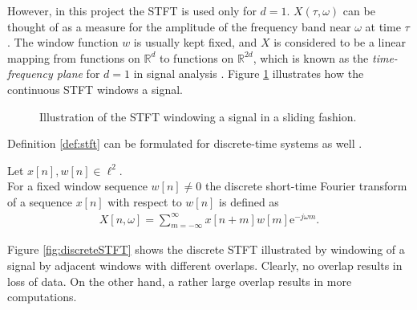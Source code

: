 However, in this project the STFT is used only for $d = 1$. $X(\tau,\omega)$ can be thought of as a measure for the amplitude of the frequency band near $\omega$ at time $\tau$. The window function $w$ is usually kept fixed, and $X$ is considered to be a linear mapping from functions on $\mathbb{R}^d$ to functions on $\mathbb{R}^{2d}$, which is known as the \textit{time-frequency plane} for $d=1$ in signal analysis \cite{page 38, FTFA}. Figure \ref{fig:sliding_stft} illustrates how the continuous STFT windows a signal.
\begin{figure}[H]
\centering
{}
\caption{Illustration of the STFT windowing a signal in a sliding fashion.}
\label{fig:sliding_stft}
\end{figure}
Definition \ref{def:stft} can be formulated for discrete-time systems as well \cite{page 846, DTSP}.
\begin{definition}\label{def:stft_discrete}
Let $x[n],w[n]\in\ell^2$. \\ For a fixed window sequence $w[n] \neq 0$ the discrete short-time Fourier transform of a sequence $x[n]$ with respect to $w[n]$ is defined as
\begin{align}
X[n, \omega] = \sum_{m=-\infty}^{\infty} x[n+m]w[m]\text{e}^{-j\omega m}.
\end{align}
\end{definition}

Figure \ref{fig:discreteSTFT} shows the discrete STFT illustrated by windowing of a signal by adjacent windows with different overlaps. Clearly, no overlap results in loss of data. On the other hand, a rather large overlap results in more computations.

